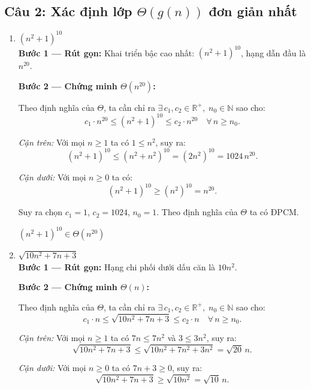 \documentclass[12pt,a4paper]{article}
\begin{document}
\subsection{Câu 2: Xác định lớp $\Theta(g(n))$ đơn giản nhất}

\begin{enumerate}[label=\textbf{\alph*.}]

  \item $(n^2 + 1)^{10}$ \\[4pt]
  \textbf{Bước 1 --- Rút gọn:} Khai triển bậc cao nhất: $(n^2+1)^{10}$, hạng dẫn đầu là $n^{20}$.

  \textbf{Bước 2 --- Chứng minh $\Theta(n^{20})$:}

  Theo định nghĩa của $\Theta$, ta cần chỉ ra $\exists\, c_1, c_2 \in \mathbb{R}^+,\; n_0 \in \mathbb{N}$ sao cho:
  \[
    c_1 \cdot n^{20} \leq (n^2+1)^{10} \leq c_2 \cdot n^{20} \quad \forall\, n \geq n_0.
  \]

  \textit{Cận trên:} Với mọi $n \geq 1$ ta có $1 \leq n^2$, suy ra:
  \[
    (n^2 + 1)^{10} \leq (n^2 + n^2)^{10} = (2n^2)^{10} = 1024\, n^{20}.
  \]

  \textit{Cận dưới:} Với mọi $n \geq 0$ ta có:
  \[
    (n^2 + 1)^{10} \geq (n^2)^{10} = n^{20}.
  \]

  Suy ra chọn $c_1 = 1$, $c_2 = 1024$, $n_0 = 1$. Theo định nghĩa của $\Theta$ ta có ĐPCM.

  \begin{resultbox}
  $(n^2+1)^{10} \in \Theta(n^{20})$
  \end{resultbox}

  \bigskip

  \item $\sqrt{10n^2 + 7n + 3}$ \\[4pt]
  \textbf{Bước 1 --- Rút gọn:} Hạng chi phối dưới dấu căn là $10n^2$.

  \textbf{Bước 2 --- Chứng minh $\Theta(n)$:}

  Theo định nghĩa của $\Theta$, ta cần chỉ ra $\exists\, c_1, c_2 \in \mathbb{R}^+,\; n_0 \in \mathbb{N}$ sao cho:
  \[
    c_1 \cdot n \leq \sqrt{10n^2 + 7n + 3} \leq c_2 \cdot n \quad \forall\, n \geq n_0.
  \]

  \textit{Cận trên:} Với mọi $n \geq 1$ ta có $7n \leq 7n^2$ và $3 \leq 3n^2$, suy ra:
  \[
    \sqrt{10n^2 + 7n + 3} \leq \sqrt{10n^2 + 7n^2 + 3n^2} = \sqrt{20}\, n.
  \]

  \textit{Cận dưới:} Với mọi $n \geq 0$ ta có $7n + 3 \geq 0$, suy ra:
  \[
    \sqrt{10n^2 + 7n + 3} \geq \sqrt{10n^2} = \sqrt{10}\, n.
  \]


\end{enumerate}
\end{document}
